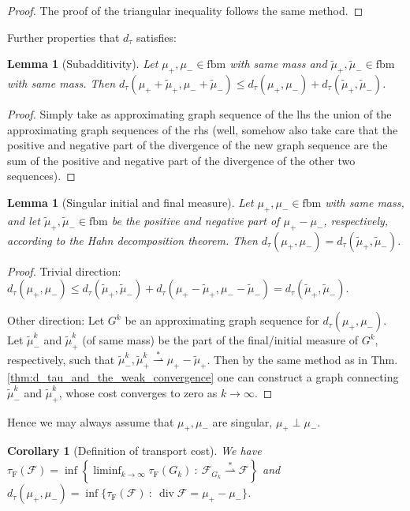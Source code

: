 \documentclass[10pt,a4paper,oneside,final]{article}
\DeclareMathOperator{\dv}{div}
\newcommand{\fbm}{{\mathrm{fbm}}}
\newcommand{\weakstarto}{\stackrel{*}{\rightharpoonup}}
\newcommand{\flux}{{\mathcal{F}}}
\newcommand{\JEnXia}[1][\tau]{#1_{\mathrm{F}}}%
\newcommand{\dtau}{d_\tau}
\numberwithin{equation}{section}
\theoremstyle{plain}
\newtheorem{lemma}[theorem]{Lemma}
\newtheorem{corollary}[theorem]{Corollary}
\theoremstyle{definition}
\theoremstyle{remark}
\begin{document}
{\begin{proof}
The proof of the triangular inequality follows the same method.
\end{proof}

Further properties that $\dtau$ satisfies:

\begin{lemma}[Subadditivity]
Let $\mu_+,\mu_-\in\fbm$ with same mass and $\tilde\mu_+,\tilde\mu_-\in\fbm$ with same mass. Then $\dtau(\mu_++\tilde\mu_+,\mu_-+\tilde\mu_-)\leq\dtau(\mu_+,\mu_-)+\dtau(\tilde\mu_+,\tilde\mu_-)$.
\end{lemma}
\begin{proof}
Simply take as approximating graph sequence of the lhs the union of the approximating graph sequences of the rhs (well, somehow also take care that the positive and negative part of the divergence of the new graph sequence are the sum of the positive and negative part of the divergence of the other two sequences).
\end{proof}

\begin{lemma}[Singular initial and final measure]
Let $\mu_+,\mu_-\in\fbm$ with same mass, and let $\tilde\mu_+,\tilde\mu_-\in\fbm$ be the positive and negative part of $\mu_+-\mu_-$, respectively, according to the Hahn decomposition theorem.
Then $\dtau(\mu_+,\mu_-)=\dtau(\tilde\mu_+,\tilde\mu_-)$.
\end{lemma}
\begin{proof}
Trivial direction: $\dtau(\mu_+,\mu_-)\leq\dtau(\tilde\mu_+,\tilde\mu_-)+\dtau(\mu_+-\tilde\mu_+,\mu_--\tilde\mu_-)=\dtau(\tilde\mu_+,\tilde\mu_-)$.

Other direction: Let $G^k$ be an approximating graph sequence for $\dtau(\mu_+,\mu_-)$.
Let $\tilde\mu^k_-$ and $\tilde\mu^k_+$ (of same mass) be the part of the final/initial measure of $G^k$, respectively, such that $\tilde\mu^k_-,\tilde\mu^k_+\weakstarto\mu_+-\tilde\mu_+$.
Then by the same method as in Thm.\,\ref{thm:d_tau_and_the_weak_convergence} one can construct a graph connecting $\tilde\mu^k_-$ and $\tilde\mu^k_+$, whose cost converges to zero as $k\to\infty$.
\end{proof}

Hence we may always assume that $\mu_+,\mu_-$ are singular, $\mu_+\perp\mu_-$.

\begin{corollary}[Definition of transport cost]
We have $\JEnXia(\flux)=\inf\left\{\liminf_{k \to \infty} \JEnXia(G_k) \ : \ \flux_{G_k}\weakstarto\flux\right\}$
and $\dtau(\mu_+,\mu_-)=\inf\{\JEnXia(\flux)\ :\ \dv\flux=\mu_+-\mu_-\}$.
\end{corollary}

}
\end{document}
